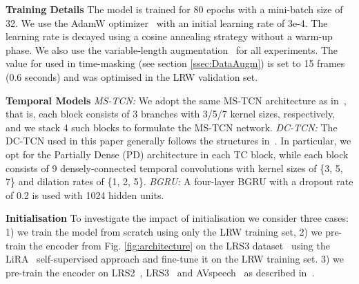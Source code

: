 \documentclass{article}
\begin{document}
\noindent\textbf{Training Details}\quad
The model is trained for 80 epochs with a mini-batch size of 32. 
We use the AdamW optimizer~\cite{loshchilov2017decoupled} with an initial learning rate of 3e-4. The learning rate is decayed using a cosine annealing strategy without a warm-up phase. We also use the variable-length augmentation~\cite{martinez2020lipreading} for all experiments. The value for  used in time-masking (see section \ref{ssec:DataAugm}) is set to 15 frames (0.6 seconds) and was optimised in the LRW validation set. 

\noindent\textbf{Temporal Models}\quad
\textit{MS-TCN:} We adopt the same MS-TCN architecture as in~\cite{martinez2020lipreading}, that is, each block consists of 3 branches with 3/5/7 kernel sizes, respectively, and we stack 4 such blocks to formulate the MS-TCN network.
\textit{DC-TCN:}
The DC-TCN used in this paper generally follows the structures in~\cite{ma2021lip}. In particular, we opt for the Partially Dense (PD) architecture in each TC block, while each block consists of 9 densely-connected temporal convolutions with kernel sizes of \{3, 5, 7\} and dilation rates of \{1, 2, 5\}.  
\textit{BGRU:} A four-layer BGRU with a dropout rate of 0.2 is used with 1024 hidden units.

\noindent\textbf{Initialisation}\quad
To investigate the impact of initialisation we consider three cases: 1) we train the model from scratch using only the LRW training set, 2) we pre-train the encoder from Fig. \ref{fig:architecture} on the LRS3 dataset~\cite{Afouras18d} using the LiRA~\cite{DBLP:journals/corr/abs-2106-09171} self-supervised approach and fine-tune it on the LRW training set. 3) we pre-train the encoder on LRS2~\cite{chung16b}, LRS3~\cite{Afouras18d} and AVspeech~\cite{DBLP:journals/tog/EphratMLDWHFR18} as described in~\cite{ma2022visual}.
\end{document}
